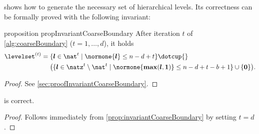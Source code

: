  shows how to generate the necessary set of
hierarchical levels.
Its correctness can be formally proved with the following invariant:
\begin{restatable}{%
  proposition%
}{%
  propInvariantCoarseBoundary%
}
  \label{prop:invariantCoarseBoundary}
  After iteration $t$ of \cref{alg:coarseBoundary}
  ($t = 1, \dotsc, d$), it holds
  \begin{equation}
    \label{eq:coarseInvariant}
    \begin{split}
      \levelset^{(t)}
      &= \{\*l \in \nat^t \mid \normone{\*l} \le n - d + t\} \dotcup {}\\
      &\hphantom{{}={}} \paren*{
        \{\*l \in \natz^t \setminus \nat^t \mid
        \normone{\vecmax(\*l, \*1)} \le n-d+t-b+1\} \cup \{\*0\}
      }.
    \end{split}
  \end{equation}
\end{restatable}
\begin{proof}
  See \cref{sec:proofInvariantCoarseBoundary}.
\end{proof}
\begin{shortcorollary}
  \label{cor:algCoarseBoundaryCorrectness}
   is correct.
\end{shortcorollary}
\begin{proof}
  Follows immediately from \cref{prop:invariantCoarseBoundary}
  by setting $t = d$.
\end{proof}

